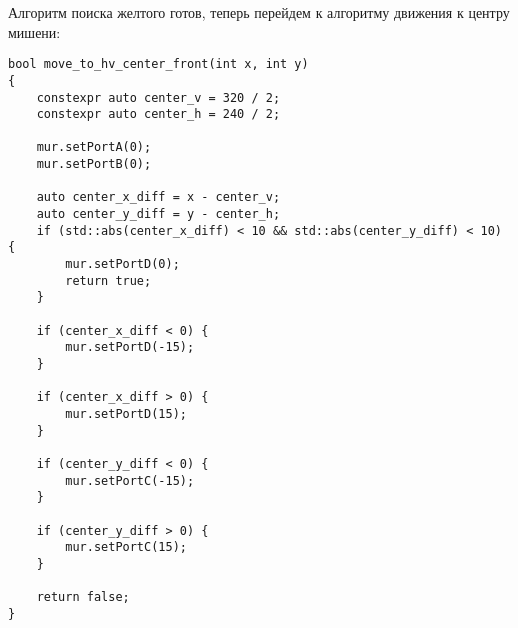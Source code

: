 Алгоритм поиска желтого готов, теперь перейдем к алгоритму движения к центру мишени:

\begin{verbatim}
bool move_to_hv_center_front(int x, int y)
{
    constexpr auto center_v = 320 / 2;
    constexpr auto center_h = 240 / 2;

    mur.setPortA(0);
    mur.setPortB(0);

    auto center_x_diff = x - center_v;
    auto center_y_diff = y - center_h;
    if (std::abs(center_x_diff) < 10 && std::abs(center_y_diff) < 10) {
        mur.setPortD(0);
        return true;
    }

    if (center_x_diff < 0) {
        mur.setPortD(-15);
    }

    if (center_x_diff > 0) {
        mur.setPortD(15);
    }

    if (center_y_diff < 0) {
        mur.setPortC(-15);
    }

    if (center_y_diff > 0) {
        mur.setPortC(15);
    }

    return false;
}
\end{verbatim}

